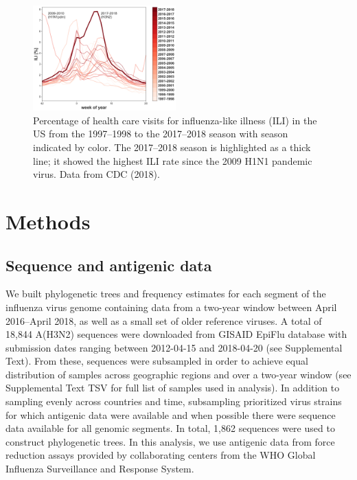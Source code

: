 \begin{figure}[t]
    \begin{center}
    \includegraphics[width=0.49\textwidth]{figures/ili_1997_2018.png}
    \end{center}
    \caption{Percentage of health care visits for influenza-like illness (ILI) in the US from the 1997--1998 to the 2017--2018 season with season indicated by color. The 2017--2018 season is highlighted as a thick line; it showed the highest ILI rate since the 2009 H1N1 pandemic virus. Data from CDC (2018).}
    \label{fig:ili}
\end{figure}

\section*{Methods}
\subsection*{Sequence and antigenic data}
We built phylogenetic trees and frequency estimates for each segment of the influenza virus genome containing data from a two-year window between April 2016--April 2018, as well as a small set of older reference viruses.
A total of 18,844 A(H3N2) sequences were downloaded from GISAID EpiFlu database with submission dates ranging between 2012-04-15 and 2018-04-20 (see Supplemental Text).
From these, sequences were subsampled in order to achieve equal distribution of samples across geographic regions and over a two-year window (see Supplemental Text TSV for full list of samples used in analysis).
In addition to sampling evenly across countries and time, subsampling prioritized virus strains for which antigenic data were available and when possible there were sequence data available for all genomic segments.
In total, 1,862 sequences were used to construct phylogenetic trees.
In this analysis, we use antigenic data from force reduction assays provided by collaborating centers from the WHO Global Influenza Surveillance and Response System.


